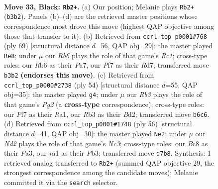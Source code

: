 \documentclass[11pt]{article}
\begin{document}
\clearpage

\begin{figure}[p]\centering
\begin{subfigure}{0.46\textwidth}\centering
\resizebox{\linewidth}{!}{%
\newchessgame
\chessboard[
  setfen={2b4k/3n1p1p/1r4p1/3PP3/1p2P3/1r4P1/5K1P/R5NR b - - 0 33},
  showmover=false,
  pgfstyle=straightmove, color=movearrow, markmove={b3-b2}
]}
\caption{}
\end{subfigure}\hfill
\begin{subfigure}{0.46\textwidth}\centering
\resizebox{\linewidth}{!}{%
\newchessgame
\chessboard[
  setfen={2r5/pp1r1p1k/4n2p/3p1N1P/3P2P1/5R2/PP4R1/1K6 b - - 2 35},
  showmover=false,
  pgfstyle=straightmove, color=movearrow, markmove={c8-e8}
]}
\caption{}
\end{subfigure}
\\[4pt]
\begin{subfigure}{0.46\textwidth}\centering
\resizebox{\linewidth}{!}{%
\newchessgame
\chessboard[
  setfen={r1r5/p3k1p1/1p3n1p/4p2P/1R6/1P6/P2B1PP1/R3K3 w Q - 0 28},
  showmover=false,
  pgfstyle=straightmove, color=movearrow, markmove={g2-g4}
]}
\caption{}
\end{subfigure}\hfill
\begin{subfigure}{0.46\textwidth}\centering
\resizebox{\linewidth}{!}{%
\newchessgame
\chessboard[
  setfen={6r1/p2r1p1p/2knp3/3p4/R5P1/PPN4P/2P5/2K1R3 w - - 5 29},
  showmover=false,
  pgfstyle=straightmove, color=movearrow, markmove={c3-e2}
]}
\caption{}
\end{subfigure}
\caption{\textbf{Move 33, Black: \texttt{Rb2+}.} (a) Our position; Melanie plays \texttt{Rb2+} (\texttt{b3b2}). Panels (b)--(d) are the retrieved master positions whose correspondence most drove this move (highest QAP objective among those that transfer to it). (b) Retrieved from \texttt{ccrl\_top\_p0001\#768} (ply 69) [structural distance $d$=56, QAP obj=29]: the master played \texttt{Re8}; under $\mu$ our \emph{Rb6} plays the role of that game's \emph{Rc1}; cross-type roles: our \emph{R}b6 as their \emph{P}a7, our \emph{P}f7 as their \emph{R}d7; transferred move \texttt{b3b2} \textbf{(endorses this move)}. (c) Retrieved from \texttt{ccrl\_top\_p0000\#2738} (ply 54) [structural distance $d$=55, QAP obj=35]: the master played \texttt{g4}; under $\mu$ our \emph{Rb3} plays the role of that game's \emph{Pg2} (a \textbf{cross-type} correspondence); cross-type roles: our \emph{P}f7 as their \emph{R}a1, our \emph{R}b3 as their \emph{B}d2; transferred move \texttt{b6c6}. (d) Retrieved from \texttt{ccrl\_top\_p0001\#1748} (ply 56) [structural distance $d$=41, QAP obj=30]: the master played \texttt{Ne2}; under $\mu$ our \emph{Nd2} plays the role of that game's \emph{Nc3}; cross-type roles: our \emph{B}c8 as their \emph{P}a3, our \emph{r}a1 as their \emph{P}b3; transferred move \texttt{d7b8}. Synthesis: 1 retrieved analog transferred to \texttt{Rb2+} (summed QAP objective 29, the strongest correspondence among the candidate moves); Melanie committed it via the \texttt{search} selector.}
\label{fig:thought-m65}
\end{figure}
\end{document}
